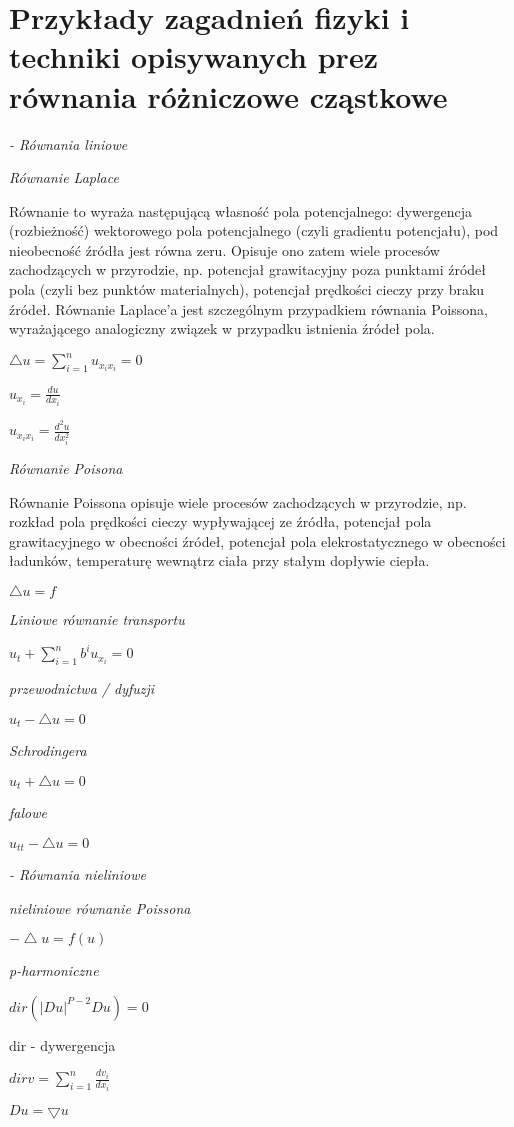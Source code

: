 \section{Przykłady zagadnień fizyki i techniki opisywanych prez równania różniczowe cząstkowe}


\textit{- Równania liniowe}


\textit{Równanie Laplace}


Równanie to wyraża następującą własność pola potencjalnego: dywergencja (rozbieżność) wektorowego pola potencjalnego (czyli gradientu potencjału), pod nieobecność źródła jest równa zeru. Opisuje ono zatem wiele procesów zachodzących w przyrodzie, np. potencjał grawitacyjny poza punktami źródeł pola (czyli bez punktów materialnych), potencjał prędkości cieczy przy braku źródeł. Równanie Laplace’a jest szczególnym przypadkiem równania Poissona, wyrażającego analogiczny związek w przypadku istnienia źródeł pola.


$ \bigtriangleup u = \sum_{i=1}^{n} u_{x_ix_i} =0$

$ u_{x_i} = \frac{du}{dx_i}$

$ u_{x_i x_i} = \frac{d^2u}{dx_i^2}$

\textit{Równanie Poisona}



Równanie Poissona opisuje wiele procesów zachodzących w przyrodzie, np. rozkład pola prędkości cieczy wypływającej ze źródła, potencjał pola grawitacyjnego w obecności źródeł, potencjał pola elekrostatycznego w obecności ładunków, temperaturę wewnątrz ciała przy stałym dopływie ciepła.

$ \bigtriangleup u =f$

\textit{Liniowe równanie transportu}

$u_t + \sum_{i=1}^{n}b^iu_{x_i} = 0$

\textit{przewodnictwa / dyfuzji}

$u_t - \bigtriangleup u = 0$

\textit{Schrodingera}

$u_t + \bigtriangleup u = 0$

\textit{falowe}

$u_{tt} - \bigtriangleup u = 0 $

\textit{- Równania nieliniowe}

\textit{ nieliniowe równanie Poissona}

$-\bigtriangleup u = f(u)$

\textit{ p-harmoniczne }

$dir( |Du|^{P-2} Du ) = 0$

dir - dywergencja

$dir v = \sum_{i=1}^n \frac{dv_i}{dx_i}$

$Du = \bigtriangledown u$

